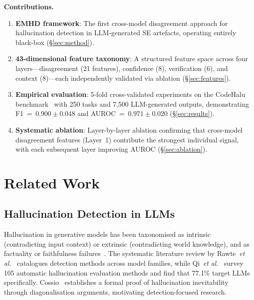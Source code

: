 \documentclass[runningheads]{llncs}
\newcommand{\etal}{\textit{et al.}}
\begin{document}
\medskip
\noindent\textbf{Contributions.}
\begin{enumerate}
\item \textbf{EMHD framework}: The first cross-model disagreement approach for hallucination detection in LLM-generated SE artefacts, operating entirely black-box (\S\ref{sec:method}).
\item \textbf{43-dimensional feature taxonomy}: A structured feature space across four layers---disagreement (21 features), confidence (8), verification (6), and context (8)---each independently validated via ablation (\S\ref{sec:features}).
\item \textbf{Empirical evaluation}: 5-fold cross-validated experiments on the CodeHalu benchmark~\cite{tian2025codehalu} with 250 tasks and 7,500 LLM-generated outputs, demonstrating F1~=~$0.900 \pm 0.048$ and AUROC~=~$0.971 \pm 0.020$ (\S\ref{sec:results}).
\item \textbf{Systematic ablation}: Layer-by-layer ablation confirming that cross-model disagreement features (Layer~1) contribute the strongest individual signal, with each subsequent layer improving AUROC (\S\ref{sec:ablation}).
\end{enumerate}


\section{Related Work}
\label{sec:related}

\subsection{Hallucination Detection in LLMs}

Hallucination in generative models has been taxonomised as intrinsic (contradicting input context) or extrinsic (contradicting world knowledge), and as factuality or faithfulness failures~\cite{huang2025survey}. The systematic literature review by Rawte~\etal~\cite{rawte2025slr} catalogues detection methods across model families, while Qi~\etal~\cite{qi2025survey} survey 105 automatic hallucination evaluation methods and find that 77.1\% target LLMs specifically. Cossio~\cite{cossio2025taxonomy} establishes a formal proof of hallucination inevitability through diagonalisation arguments, motivating detection-focused research.
\end{document}
